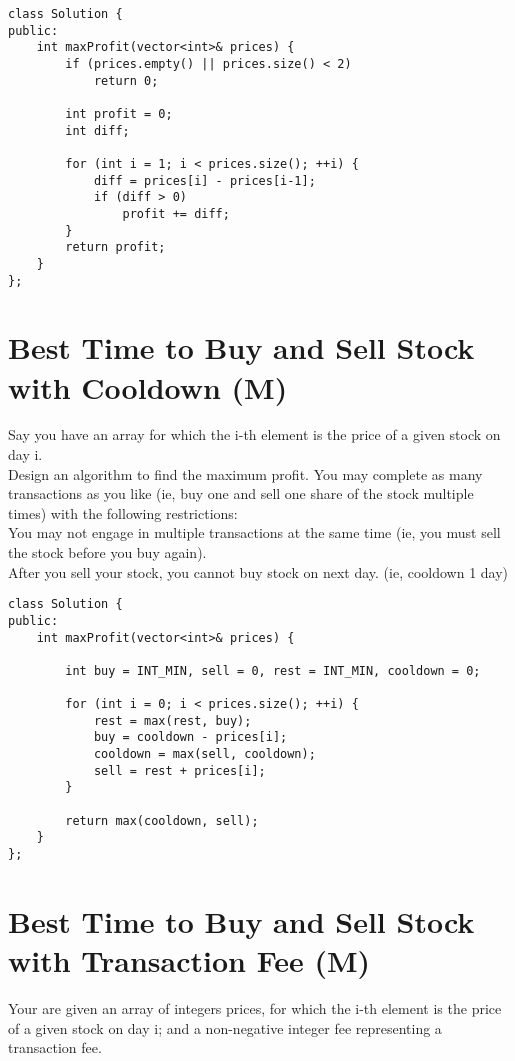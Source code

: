 \begin{lstlisting}
class Solution {
public:
    int maxProfit(vector<int>& prices) {
        if (prices.empty() || prices.size() < 2)
            return 0;
        
        int profit = 0;
        int diff;
        
        for (int i = 1; i < prices.size(); ++i) {
            diff = prices[i] - prices[i-1];
            if (diff > 0)
                profit += diff;
        }
        return profit;
    }
};
\end{lstlisting}


\section{Best Time to Buy and Sell Stock with Cooldown (M)}
Say you have an array for which the i-th element is the price of a given stock on day i.\\

Design an algorithm to find the maximum profit. You may complete as many transactions as you like (ie, buy one and sell one share of the stock multiple times) with the following restrictions:\\

    You may not engage in multiple transactions at the same time (ie, you must sell the stock before you buy again).\\
    After you sell your stock, you cannot buy stock on next day. (ie, cooldown 1 day)\\

\begin{lstlisting}
class Solution {
public:
    int maxProfit(vector<int>& prices) {

        int buy = INT_MIN, sell = 0, rest = INT_MIN, cooldown = 0;
        
        for (int i = 0; i < prices.size(); ++i) {
            rest = max(rest, buy);
            buy = cooldown - prices[i];
            cooldown = max(sell, cooldown);
            sell = rest + prices[i];
        }
        
        return max(cooldown, sell);
    }
};
\end{lstlisting}

\section{Best Time to Buy and Sell Stock with Transaction Fee (M)}
Your are given an array of integers prices, for which the i-th element is the price of a given stock on day i; and a non-negative integer fee representing a transaction fee.\\

